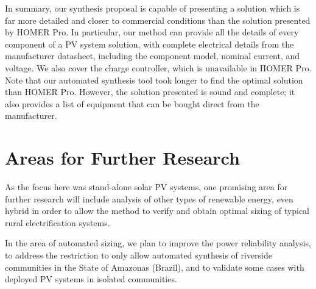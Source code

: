 In summary, our synthesis proposal is capable of presenting a solution which is far more detailed and closer to commercial conditions than the solution presented by HOMER Pro. In particular, our method can provide all the details of every component of a PV system solution, with complete electrical details from the manufacturer datasheet, including the component model, nominal current, and voltage. We also cover the charge controller, which is unavailable in HOMER Pro. Note that our automated synthesis tool took longer to find the optimal solution than HOMER Pro. However, the solution presented is sound and complete; it also provides a list of equipment that can be bought direct from the manufacturer.


\section{Areas for Further Research}

As the focus here was stand-alone solar PV systems, one promising area for further research will include analysis of other types of renewable energy, even hybrid  in order to allow the method to verify and obtain optimal sizing of typical rural electrification systems.

In the area of automated sizing, we plan to improve the power reliability analysis, to address the restriction to only allow automated synthesis of riverside communities in the State of Amazonas (Brazil), and to validate some cases with deployed PV systems in isolated communities.

